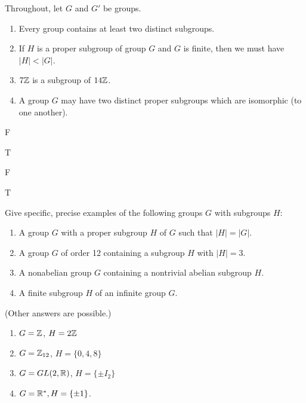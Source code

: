 \begin{exercise}[ID=4A]
\tf Throughout, let $G$ and $G'$ be  groups.

\begin{enumerate}

\item Every group contains at least two distinct subgroups.

\item If $H$ is a proper subgroup of group $G$ and $G$ is finite, then we must have $|H|<|G|$.

\item $7\mathbb{Z}$ is a subgroup of $14\mathbb{Z}$.

\item A group $G$ may have two distinct proper subgroups which are isomorphic (to one another).

\end{enumerate}
\end{exercise}

\begin{solution}[print=false]

\begin{inparaenum}[(a)]
\item F \hfill \item T \hfill \item F \hfill  \item T
\end{inparaenum}

\end{solution}


\begin{exercise}[ID=4B]
Give specific, precise examples of the following groups $G$ with subgroups $H$:
\begin{enumerate}
\item A group $G$ with a proper subgroup $H$ of $G$ such that $|H|=|G|$.
\item A group $G$ of order 12 containing a subgroup $H$ with $|H|=3$.
\item A nonabelian group $G$ containing a nontrivial abelian subgroup $H$.
\item A finite subgroup $H$ of an infinite group $G$.
\end{enumerate}

\end{exercise}

\begin{solution}[print=false]
(Other answers are possible.)


\begin{enumerate}
\item $G=\mathbb{Z}$, $H=2\mathbb{Z}$
\item $G=\mathbb{Z}_{12}$, $H=\{0,4,8\}$
\item $G=GL(2,\mathbb{R})$, $H=\{\pm I_2\}$
\item $G=\mathbb{R}^*, H=\{\pm 1\}$.
\end{enumerate}


\end{solution}

